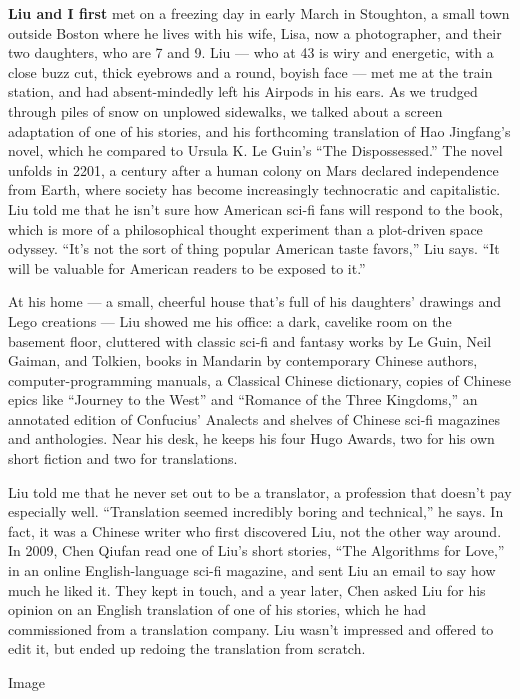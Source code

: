 \textbf{Liu and I first} met on a freezing day in early March in
Stoughton, a small town outside Boston where he lives with his wife,
Lisa, now a photographer, and their two daughters, who are 7 and 9. Liu
--- who at 43 is wiry and energetic, with a close buzz cut, thick
eyebrows and a round, boyish face --- met me at the train station, and
had absent-mindedly left his Airpods in his ears. As we trudged through
piles of snow on unplowed sidewalks, we talked about a screen adaptation
of one of his stories, and his forthcoming translation of Hao Jingfang's
novel, which he compared to Ursula K. Le Guin's ``The Dispossessed.''
The novel unfolds in 2201, a century after a human colony on Mars
declared independence from Earth, where society has become increasingly
technocratic and capitalistic. Liu told me that he isn't sure how
American sci-fi fans will respond to the book, which is more of a
philosophical thought experiment than a plot-driven space odyssey.
``It's not the sort of thing popular American taste favors,'' Liu says.
``It will be valuable for American readers to be exposed to it.''

At his home --- a small, cheerful house that's full of his daughters'
drawings and Lego creations --- Liu showed me his office: a dark,
cavelike room on the basement floor, cluttered with classic sci-fi and
fantasy works by Le Guin, Neil Gaiman, and Tolkien, books in Mandarin by
contemporary Chinese authors, computer-programming manuals, a Classical
Chinese dictionary, copies of Chinese epics like ``Journey to the West''
and ``Romance of the Three Kingdoms,'' an annotated edition of
Confucius' Analects and shelves of Chinese sci-fi magazines and
anthologies. Near his desk, he keeps his four Hugo Awards, two for his
own short fiction and two for translations.

Liu told me that he never set out to be a translator, a profession that
doesn't pay especially well. ``Translation seemed incredibly boring and
technical,'' he says. In fact, it was a Chinese writer who first
discovered Liu, not the other way around. In 2009, Chen Qiufan read one
of Liu's short stories, ``The Algorithms for Love,'' in an online
English-language sci-fi magazine, and sent Liu an email to say how much
he liked it. They kept in touch, and a year later, Chen asked Liu for
his opinion on an English translation of one of his stories, which he
had commissioned from a translation company. Liu wasn't impressed and
offered to edit it, but ended up redoing the translation from scratch.

Image

